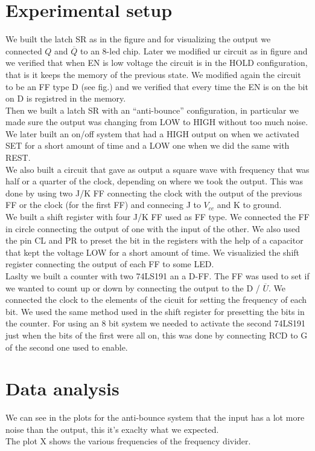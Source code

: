 \section{Experimental setup}
We built the latch SR as in the figure and for visualizing the output we  connected $Q$ and $\overbar{Q}$ to an 8-led chip. Later we modified ur circuit as in figure and we verified that when EN is low voltage the circuit is in the HOLD configuration, that is it keeps the memory of the previous state. We modified again the circuit to be an FF type D (see fig.) and we verified that every time the EN is on the bit on D is registred in the memory.\\
Then we  built a latch SR with an ``anti-bounce'' configuration, in particular we made sure the output was changing from LOW to HIGH without too much noise.\\
We later built an on/off system that had a HIGH output on when we activated SET for a short amount of time and a LOW one when we did the same with REST.\\
We also built a circuit that gave as output a square wave with frequency that was half or a quarter of  the clock, depending on where we took the output. This was done by using two J/K FF connecting the clock with the output of the previous  FF or the clock (for the first FF) and connecing J to $V_{cc}$ and K to ground.\\
We built a shift register with four J/K FF used as FF type. We connected the FF in circle connecting the output of one with the input of the other. We also used the pin CL and PR to preset the bit in the registers with the help of a capacitor that kept the voltage LOW for a short amount of time. We visualizied the shift register connecting the output of each FF to some LED.\\
Laslty we built a counter with two 74LS191 an a D-FF. The FF was  used to set if we wanted to count up or down by connecting the output to the D / $\overline{U}$. We connected the clock to the elements of the cicuit for  setting the frequency of each bit. We used the same method used in the shift register for presetting the bits in the counter. For using an 8 bit system we needed to activate the second 74LS191 just when the bits of the first were all on, this was done by connecting RCD to G of the second one used to enable.
\section{Data analysis}
We can see in the plots for the anti-bounce system that the input has a lot more noise than the output, this it's exaclty what we expected.\\
The plot X shows the various frequencies of the frequency divider.\\

